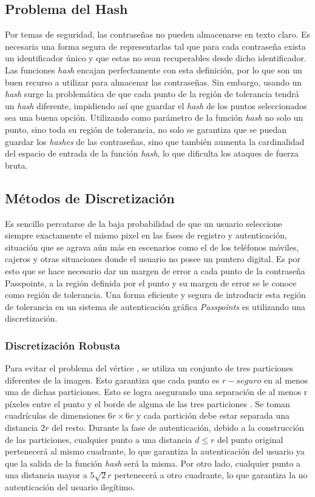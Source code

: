 \subsection{Problema del Hash}
Por temas de seguridad, las contraseñas no pueden almacenarse en texto claro. Es necesaria una forma segura de representarlas tal que para cada contraseña exista un identificador único y que estas no sean recuperables desde dicho identificador. Las funciones \textit{hash} \cite{legon2019nuevo, borrego2018debilidades} encajan perfectamente con esta definición, por lo que son un buen recurso a utilizar para almacenar las contraseñas. Sin embargo, usando un \textit{hash} surge la problemática de que cada punto de la región de tolerancia tendrá un \textit{hash} diferente, impidiendo así que guardar el \textit{hash} de los puntos seleccionados sea una buena opción. Utilizando como parámetro de la función \textit{hash} no solo un punto, sino toda su región de tolerancia, no solo se garantiza que se puedan guardar los \textit{hashes} de las contraseñas, sino que también aumenta la cardinalidad del espacio de entrada de la función \textit{hash}, lo que dificulta los ataques de fuerza bruta.
	
\subsection{M\'etodos de Discretizaci\'on}	
Es sencillo percatarse de la baja probabilidad de que un usuario seleccione siempre exactamente el mismo pixel en las fases de registro y autenticación, situación que se agrava aún más en escenarios como el de los teléfonos móviles, cajeros y otras situaciones donde el usuario no posee un puntero digital. Es por  esto que se hace necesario dar un margen de error a cada punto de la contraseña Passpoints, a la región definida por el punto y su margen de error se le conoce como región de tolerancia. Una forma eficiente y segura de introducir esta región de tolerancia en un sistema de autenticación gráfica \textit{Passpoints} es utilizando una discretización.
\subsubsection{Discretización Robusta}

Para evitar el problema del vértice \cite{birget2006graphical}, se utiliza un conjunto de tres particiones diferentes de la imagen. Esto garantiza que cada punto es $r-seguro$ en al menos una de dichas particiones. Esto se logra asegurando una separación de al menos r píxeles entre el punto y el borde de alguna de las tres particiones \cite{zhu2013security, chiasson2008centered}. Se toman cuadrículas de dimensiones \(6r \times 6r\) y cada partición debe estar separada una distancia \(2r\) del resto. Durante la fase de autenticación, debido a la construcción de las particiones, cualquier punto a una distancia \(d \leq r\) del punto original pertenecerá al mismo cuadrante, lo que garantiza la autenticación del usuario ya que la salida de la función \textit{hash} será la misma. Por otro lado, cualquier punto a una distancia mayor a \(5\sqrt{2}r\) pertenecerá a otro cuadrante, lo que garantiza la no autenticación del usuario ilegítimo.


